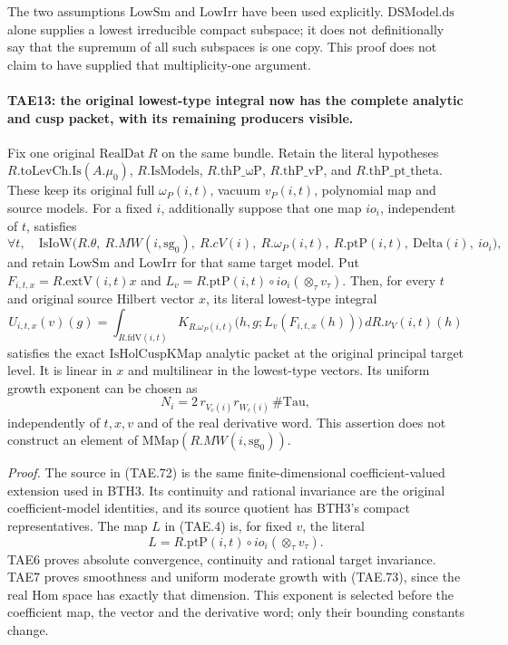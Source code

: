 The two assumptions \(\mathrm{LowSm}\) and
\(\mathrm{LowIrr}\) have been used explicitly.
\(\mathrm{DSModel.ds}\) alone supplies a lowest
irreducible compact subspace; it does not definitionally
say that the supremum of all such subspaces is one copy.
This proof does not claim to have supplied that
multiplicity-one argument.

\paragraph{TAE13: the original lowest-type integral now has the complete analytic and cusp packet, with its remaining producers visible.}
\label{claim:TAE13}
Fix one original \(\mathrm{RealDat}\ R\) on the same bundle.
Retain the literal hypotheses
\(R.\mathrm{toLevCh.Is}(A.\mu_0)\),
\(R.\mathrm{IsModels}\),
\(R.\mathrm{thP\_\omega P}\),
\(R.\mathrm{thP\_vP}\), and
\(R.\mathrm{thP\_pt\_theta}\).
These keep its original full \(\omega_P(i,t)\),
vacuum \(v_P(i,t)\), polynomial map and source models.
For a fixed \(i\), additionally
suppose that one map \(io_i\), independent of \(t\), satisfies
\[
 \forall t,\quad
 \mathrm{IsIoW}\bigl(
     R.\theta,\ R.MW(i,\mathrm{sg}_0),\ R.cV(i),\
     R.\omega_P(i,t),\ R.\mathrm{ptP}(i,t),\
     \mathrm{Delta}(i),\ io_i\bigr),
 \tag{TAE.71}
\]
and retain \(\mathrm{LowSm}\) and \(\mathrm{LowIrr}\)
for that same target model.
Put \(F_{i,t,x}=R.\mathrm{extV}(i,t)x\) and
\(L_v=R.\mathrm{ptP}(i,t)\circ io_i(\otimes_\tau v_\tau)\).
Then, for every \(t\) and original source Hilbert vector \(x\),
its literal lowest-type integral
\[
 U_{i,t,x}(v)(g)=
  \int_{R.\mathrm{fdV}(i,t)}
   K_{R.\omega_P(i,t)}\bigl(h,g;L_v(F_{i,t,x}(h))\bigr)
                       \,dR.\nu_V(i,t)(h)
 \tag{TAE.72}
\]
satisfies the exact \(\mathrm{IsHolCuspKMap}\) analytic
packet at the original principal target level.
It is linear in \(x\) and multilinear in the lowest-type
vectors.  Its uniform growth exponent can be chosen as
\[
       N_i=2\,r_{V_c(i)}r_{W_c(i)}\,\#\mathrm{Tau},
 \tag{TAE.73}
\]
independently of \(t,x,v\) and of the real derivative word.
This assertion does not construct an element of
\(\mathrm{MMap}(R.MW(i,\mathrm{sg}_0))\).

\emph{Proof.}
The source in (TAE.72) is the same finite-dimensional
coefficient-valued extension used in BTH3.  Its continuity
and rational invariance are the original coefficient-model
identities, and its source quotient has BTH3's compact
representatives.  The map \(L\) in (TAE.4) is, for fixed
\(v\), the literal
\[
             L=R.\mathrm{ptP}(i,t)\circ
                          io_i(\otimes_\tau v_\tau).
 \tag{TAE.74}
\]
TAE6 proves absolute convergence, continuity and rational
target invariance.  TAE7 proves smoothness and uniform
moderate growth with (TAE.73), since the real Hom space
has exactly that dimension.  This exponent is selected
before the coefficient map, the vector and the derivative
word; only their bounding constants change.

